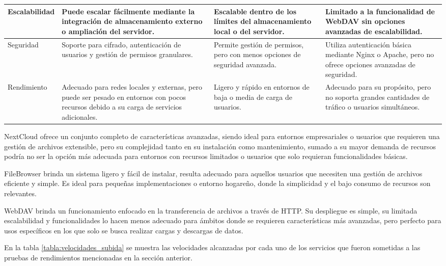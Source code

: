 \documentclass[a4paper,10pt]{article}
\begin{document}
\begin{table}[htbp]
\begin{tabularx}{\textwidth}{|X|X|X|X|}
			\hline
			Escalabilidad & Puede escalar fácilmente mediante la integración de almacenamiento externo o ampliación del servidor. & Escalable dentro de los límites del almacenamiento local o del servidor. & Limitado a la funcionalidad de WebDAV sin opciones avanzadas de escalabilidad. \\
			\hline
			Seguridad & Soporte para cifrado, autenticación de usuarios y gestión de permisos granulares. & Permite gestión de permisos, pero con menos opciones de seguridad avanzada. & Utiliza autenticación básica mediante Nginx o Apache, pero no ofrece opciones avanzadas de seguridad. \\
			\hline
			Rendimiento & Adecuado para redes locales y externas, pero puede ser pesado en entornos con pocos recursos debido a su carga de servicios adicionales. & Ligero y rápido en entornos de baja o media de carga de usuarios. & Adecuado para su propósito, pero no soporta grandes cantidades de tráfico o usuarios simultáneos. \\
			\hline
		\end{tabularx}
	\end{table}
	
	NextCloud ofrece un conjunto completo de características avanzadas, siendo ideal para entornos empresariales o usuarios que requieren una gestión de archivos extensible, pero su complejidad tanto en su instalación como mantenimiento, sumado a su mayor demanda de recursos podría no ser la opción más adecuada para entornos con recursos limitados o usuarios que solo requieran funcionalidades básicas.
	
	FileBrowser brinda un sistema ligero y fácil de instalar, resulta adecuado para aquellos usuarios que necesiten una gestión de archivos eficiente y simple. Es ideal para pequeñas implementaciones o entorno hogareño, donde la simplicidad y el bajo consumo de recursos son relevantes.

	WebDAV brinda un funcionamiento enfocado en la transferencia de archivos a través de HTTP. Su despliegue es simple, su limitada escalabilidad y funcionalidades lo hacen menos adecuado para ámbitos donde se requieren características más avanzadas, pero perfecto para usos específicos en los que solo se busca realizar cargas y descargas de datos.
	
	En la tabla \ref{tabla:velocidades_subida} se muestra las velocidades alcanzadas por cada uno de los servicios que fueron sometidas a las pruebas de rendimientos mencionadas en la sección anterior.
\end{document}
